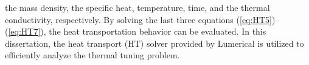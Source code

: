     the mass density, the specific heat, temperature, time, and the thermal conductivity, respectively.
    By solving the last three equations (\ref{eq:HT5})--(\ref{eq:HT7}), 
    the heat transportation behavior can be evaluated. 
    In this dissertation, 
    the heat transport (HT) solver provided by Lumerical is utilized to efficiently analyze the thermal tuning problem. 
    
